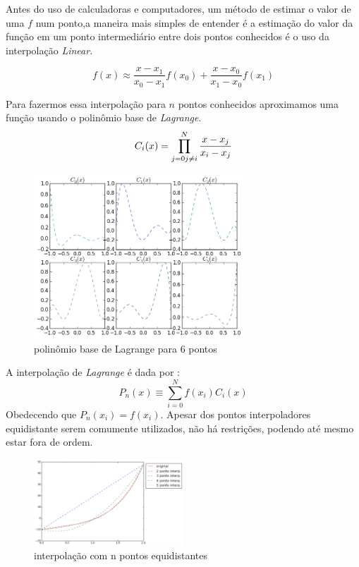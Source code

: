  Antes do uso de calculadoras e computadores, um método de estimar o valor de uma $f$ num ponto,a   maneira mais simples de entender é a estimação do valor da função em um ponto intermediário entre dois pontos conhecidos é o uso da interpolação \emph{Linear}.

\begin{equation}
	f(x) \approx \frac{x - x_1}{x_0 - x_1}f(x_0)  + \frac{x - x_0}{x_1 - x_0}f(x_1)
\end{equation} 
 
 Para fazermos essa interpolação para $n$ pontos conhecidos aproximamos uma função usando o polinômio base de \emph{Lagrange}.
\begin{equation}
C_i(x) = \prod_{j = 0 \\ j \neq i}^{N} \frac{x - x_j}{x_i - x_j} 
\end{equation}

\begin{figure}[!h]
\includegraphics[width=0.7\textwidth, center ]{figuras/exemplo_polinomio_lagrange.png}
\caption{polinômio base de Lagrange para 6 pontos}
\end{figure}

 A interpolação de \emph{Lagrange} é dada por :
\begin{equation}
 P_n(x) \equiv \sum_{i = 0}^{N} f(x_i)C_i(x) 
\end{equation}
 Obedecendo que $P_n(x_i) = f(x_i)$. Apesar dos pontos interpoladores equidistante serem comumente utilizados, não há restrições, podendo até mesmo estar fora de ordem.
\begin{figure}[h]
  \includegraphics[width=0.5\textwidth, center]{figuras/interpolacao_linear5.png}
  \caption{interpolação com n pontos equidistantes}
\end{figure}

